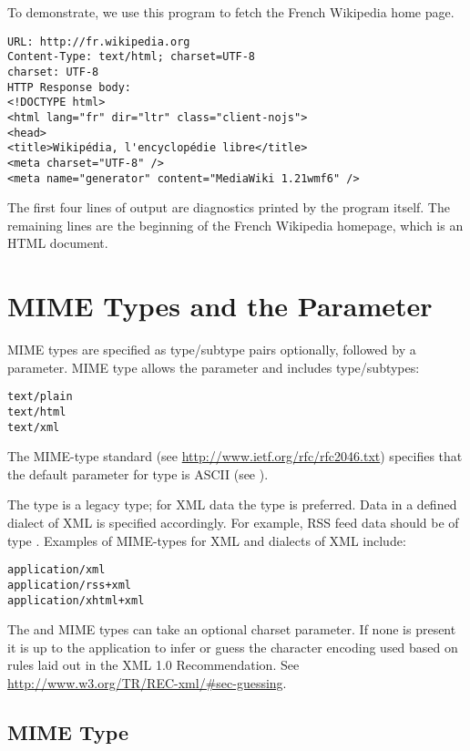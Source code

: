 To demonstrate, we use this program to fetch the French Wikipedia home page.
\begin{verbatim}   
URL: http://fr.wikipedia.org
Content-Type: text/html; charset=UTF-8
charset: UTF-8
HTTP Response body:
<!DOCTYPE html>
<html lang="fr" dir="ltr" class="client-nojs">
<head>
<title>Wikipédia, l'encyclopédie libre</title>
<meta charset="UTF-8" />
<meta name="generator" content="MediaWiki 1.21wmf6" />
\end{verbatim}
The first four lines of output are diagnostics printed by the  program itself.
The remaining lines are the beginning of the French Wikipedia homepage,
which is an HTML document.


\section{MIME Types and the   Parameter}

MIME types are specified as type/subtype pairs optionally, followed by a parameter. 
MIME type  allows the  parameter and includes type/subtypes:
\begin{verbatim} 
text/plain 
text/html
text/xml
\end{verbatim}
The MIME-type standard (see \url{http://www.ietf.org/rfc/rfc2046.txt}) specifies
that the default  parameter for type  is ASCII (see ).

The type  is a legacy type; for XML data the type 
 is preferred. 
Data in a defined dialect of XML is specified accordingly.
For example, RSS feed data should be of type .
Examples of MIME-types for XML and dialects of XML include:
\begin{verbatim}  
application/xml
application/rss+xml 
application/xhtml+xml 
\end{verbatim}  
The  and  MIME types can take an
optional charset parameter.  If none is present it is up to the application
to infer or guess the character encoding used based on rules laid out
in the XML 1.0 Recommendation.  See \url{http://www.w3.org/TR/REC-xml/#sec-guessing}.

\subsection{MIME Type }\label{section:urlencoding}

